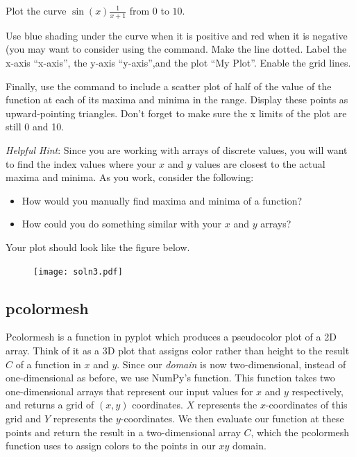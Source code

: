 \begin{problem} Plot the curve $\sin(x)\frac{1}{x+1}$ from $0$ to $10$.

Use blue shading under the curve when it is positive and red when it is negative (you may want to consider using the  command.
Make the line dotted.
Label the x-axis ``x-axis'', the y-axis ``y-axis'',and the plot ``My Plot''.
Enable the grid lines.

Finally, use the  command to include a scatter plot of half of the value of the function at each of its maxima and minima in the range.
Display these points as upward-pointing triangles.
Don't forget to make sure the x limits of the plot are still 0 and 10.

\emph{Helpful Hint}: Since you are working with arrays of discrete values, you will want to find the index values where your $x$ and $y$ values are closest to the actual maxima and minima. As you work, consider the following:
\begin{itemize}
\item How would you manually find maxima and minima of a function?
\item How could you do something similar with your $x$ and $y$ arrays?
\end{itemize}
Your plot should look like the figure below.

\begin{figure}[H]
\texttt{[image: soln3.pdf]}
\label{fig:problem3}
\end{figure}
\end{problem}

\subsection*{pcolormesh}
Pcolormesh is a function in pyplot which produces a pseudocolor plot of a 2D array.
Think of it as a 3D plot that assigns color rather than height to the result $C$ of a function in $x$ and $y$.
Since our \emph{domain} is now two-dimensional, instead of one-dimensional as before, we use NumPy's  function.
This function takes two one-dimensional arrays that represent our input values for $x$ and $y$ respectively, and returns a grid of $(x, y)$ coordinates.
$X$ represents the $x$-coordinates of this grid and $Y$ represents the $y$-coordinates.
We then evaluate our function at these points and return the result in a two-dimensional array $C$, which the pcolormesh function uses to assign colors to the points in our $xy$ domain.

